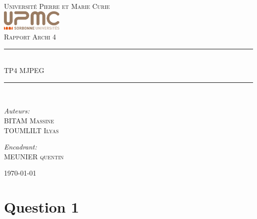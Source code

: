 \documentclass[12pt]{article}
\newcommand{\HRule}{\rule{\linewidth}{0.5mm}}
\begin{document}
\begin{titlepage}
  \begin{center}
    \textsc{\LARGE Université Pierre et Marie Curie}\\[1.5cm]
    \includegraphics[height=1cm]{upmc.png}\\[1.5cm]
    \textsc{\Large Rapport Archi 4 }\\[2cm]
    \HRule \\[1cm]
    \textsc{\huge TP4 MJPEG }\\[0.5cm]
    \HRule \\[1cm]
    \noindent
    \begin{minipage}[t]{0.55\textwidth}
      \begin{flushleft} \large
        \emph{Auteurs:}\\
        BITAM \textsc{Massine}\\
        TOUMLILT \textsc{Ilyas}
      \end{flushleft}
    \end{minipage}%
    \begin{minipage}[t]{0.47\textwidth}
      \begin{flushright} \large
        \emph{Encadrant:} \\
        MEUNIER \textsc{quentin}
      \end{flushright}
    \end{minipage}
    \vfill
    {\large \today}
  \end{center}
\end{titlepage}
\section*{Question 1}
\end{document}
